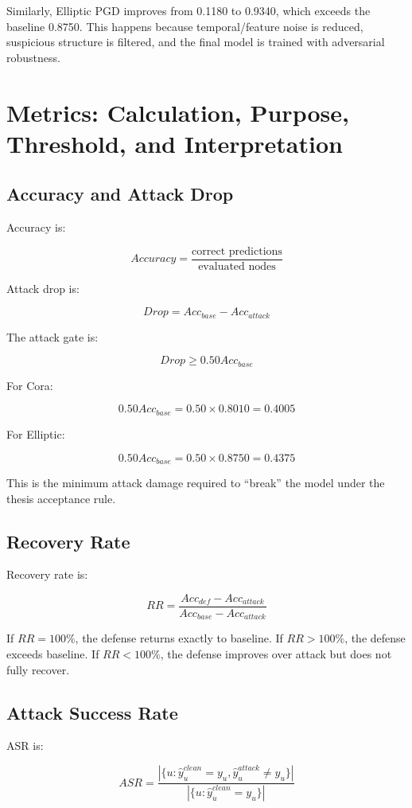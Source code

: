 \documentclass[12pt,a4paper]{article}
\begin{document}
Similarly, Elliptic PGD improves from 0.1180 to 0.9340, which exceeds the baseline 0.8750. This happens because temporal/feature noise is reduced, suspicious structure is filtered, and the final model is trained with adversarial robustness.

\section{Metrics: Calculation, Purpose, Threshold, and Interpretation}

\subsection{Accuracy and Attack Drop}
Accuracy is:

$$
Accuracy=\frac{\text{correct predictions}}{\text{evaluated nodes}}
$$

Attack drop is:

$$
Drop=Acc_{base}-Acc_{attack}
$$

The attack gate is:

$$
Drop\geq 0.50Acc_{base}
$$

For Cora:

$$
0.50Acc_{base}=0.50\times0.8010=0.4005
$$

For Elliptic:

$$
0.50Acc_{base}=0.50\times0.8750=0.4375
$$

This is the minimum attack damage required to ``break'' the model under the thesis acceptance rule.

\subsection{Recovery Rate}
Recovery rate is:

$$
RR=\frac{Acc_{def}-Acc_{attack}}{Acc_{base}-Acc_{attack}}
$$

If $RR=100\%$, the defense returns exactly to baseline. If $RR>100\%$, the defense exceeds baseline. If $RR<100\%$, the defense improves over attack but does not fully recover.

\subsection{Attack Success Rate}
ASR is:

$$
ASR=\frac{|\{u:\hat{y}^{clean}_u=y_u,\hat{y}^{attack}_u\neq y_u\}|}{|\{u:\hat{y}^{clean}_u=y_u\}|}
$$
\end{document}

